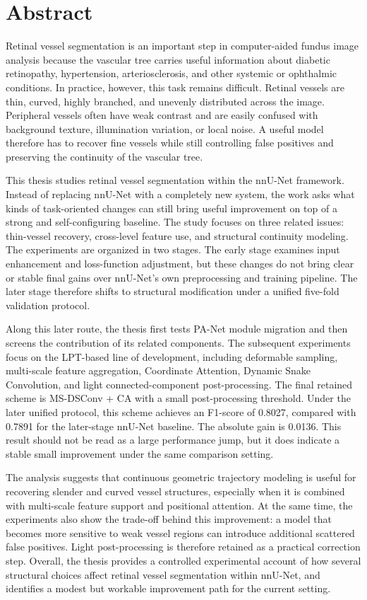 \documentclass[a4paper,11pt]{article}
\begin{document}
\onehalfspacing

\section*{Abstract}
Retinal vessel segmentation is an important step in computer-aided fundus image analysis because the vascular tree carries useful information about diabetic retinopathy, hypertension, arteriosclerosis, and other systemic or ophthalmic conditions. In practice, however, this task remains difficult. Retinal vessels are thin, curved, highly branched, and unevenly distributed across the image. Peripheral vessels often have weak contrast and are easily confused with background texture, illumination variation, or local noise. A useful model therefore has to recover fine vessels while still controlling false positives and preserving the continuity of the vascular tree.

This thesis studies retinal vessel segmentation within the nnU-Net framework. Instead of replacing nnU-Net with a completely new system, the work asks what kinds of task-oriented changes can still bring useful improvement on top of a strong and self-configuring baseline. The study focuses on three related issues: thin-vessel recovery, cross-level feature use, and structural continuity modeling. The experiments are organized in two stages. The early stage examines input enhancement and loss-function adjustment, but these changes do not bring clear or stable final gains over nnU-Net's own preprocessing and training pipeline. The later stage therefore shifts to structural modification under a unified five-fold validation protocol.

Along this later route, the thesis first tests PA-Net module migration and then screens the contribution of its related components. The subsequent experiments focus on the LPT-based line of development, including deformable sampling, multi-scale feature aggregation, Coordinate Attention, Dynamic Snake Convolution, and light connected-component post-processing. The final retained scheme is MS-DSConv + CA with a small post-processing threshold. Under the later unified protocol, this scheme achieves an F1-score of 0.8027, compared with 0.7891 for the later-stage nnU-Net baseline. The absolute gain is 0.0136. This result should not be read as a large performance jump, but it does indicate a stable small improvement under the same comparison setting.

The analysis suggests that continuous geometric trajectory modeling is useful for recovering slender and curved vessel structures, especially when it is combined with multi-scale feature support and positional attention. At the same time, the experiments also show the trade-off behind this improvement: a model that becomes more sensitive to weak vessel regions can introduce additional scattered false positives. Light post-processing is therefore retained as a practical correction step. Overall, the thesis provides a controlled experimental account of how several structural choices affect retinal vessel segmentation within nnU-Net, and identifies a modest but workable improvement path for the current setting.
\end{document}
